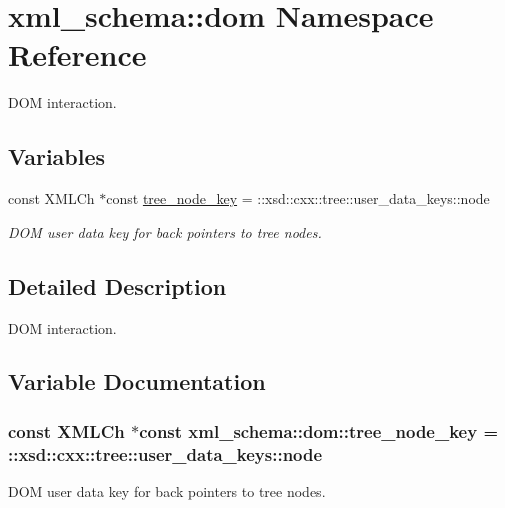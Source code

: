 \hypertarget{namespacexml__schema_1_1dom}{\section{xml\-\_\-schema\-:\-:dom Namespace Reference}
\label{namespacexml__schema_1_1dom}
}


D\-O\-M interaction.  


\subsection*{Variables}
\begin{DoxyCompactItemize}
\item 
const X\-M\-L\-Ch $\ast$const \hyperlink{namespacexml__schema_1_1dom_a825af74d328c3a1cb72aa9a61ddde150}{tree\-\_\-node\-\_\-key} = \-::xsd\-::cxx\-::tree\-::user\-\_\-data\-\_\-keys\-::node
\begin{DoxyCompactList}\small\item\em D\-O\-M user data key for back pointers to tree nodes. \end{DoxyCompactList}\end{DoxyCompactItemize}


\subsection{Detailed Description}
D\-O\-M interaction. 

\subsection{Variable Documentation}
\hypertarget{namespacexml__schema_1_1dom_a825af74d328c3a1cb72aa9a61ddde150}{
\subsubsection[{tree\-\_\-node\-\_\-key}]{\setlength{\rightskip}{0pt plus 5cm}const X\-M\-L\-Ch $\ast$const xml\-\_\-schema\-::dom\-::tree\-\_\-node\-\_\-key = \-::xsd\-::cxx\-::tree\-::user\-\_\-data\-\_\-keys\-::node}}\label{namespacexml__schema_1_1dom_a825af74d328c3a1cb72aa9a61ddde150}


D\-O\-M user data key for back pointers to tree nodes. 

